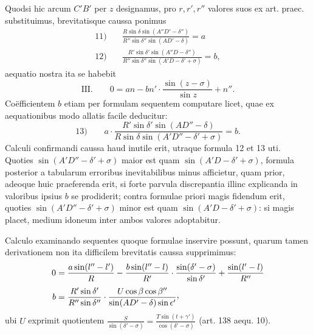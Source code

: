 Quodsi hic arcum $C'B'$ per $z$ designamus, pro $r,r',r''$ valores suos ex art.
praec. substituimus, brevitatisque caussa ponimus
\[
\begin{aligned}
11)\quad&\frac{R\sin\delta\sin(A''D'-\delta'')}{R''\sin\delta''\sin(AD'-\delta)}=a\\[.8ex]
12)\quad&\frac{R'\sin\delta'\sin(A''D-\delta'')}{R''\sin\delta''\sin(A'D-\delta'+\sigma)}=b,
\end{aligned}
\]
aequatio nostra ita se habebit
\[
\text{III.}\qquad 0=an-bn'\cdot\frac{\sin(z-\sigma)}{\sin z}+n''.
\]
Coëfficientem $b$ etiam per formulam sequentem computare licet, quae ex aequationibus modo allatis facile deducitur:
\[
13)\qquad a\cdot\frac{R'\sin\delta'\sin(AD''-\delta)}{R\sin\delta\sin(A'D''-\delta'+\sigma)}=b.
\]
Calculi confirmandi caussa haud inutile erit, utraque formula 12 et 13 uti.
\hypertarget{native-189}{}Quoties $\sin(A'D''-\delta'+\sigma)$ maior est quam $\sin(A'D-\delta'+\sigma)$, formula posterior
a tabularum erroribus inevitabilibus minus afficietur, quam prior, adeoque huic
praeferenda erit, si forte parvula discrepantia illinc explicanda in valoribus
ipsius $b$ se prodiderit; contra formulae priori magis fidendum erit, quoties
$\sin(A'D''-\delta'+\sigma)$ minor est quam $\sin(A'D-\delta'+\sigma)$: si magis placet, medium
idoneum inter ambos valores adoptabitur.

Calculo examinando sequentes quoque formulae inservire possunt, quarum
tamen derivationem non ita difficilem brevitatis caussa supprimimus:
\[
\begin{aligned}
0&=\frac{a\sin(l''-l')}{R}-\frac{b\sin(l''-l)}{R'}\cdot\frac{\sin(\delta'-\sigma)}{\sin\delta'}+\frac{\sin(l'-l)}{R''}\\[.8ex]
b&=\frac{R'\sin\delta'}{R''\sin\delta''}\cdot\frac{U\cos\beta\cos\beta''}{\sin(AD'-\delta)\sin\epsilon'}\mathpunct{\raisebox{.45ex}{,}}
\end{aligned}
\]
ubi $U$ exprimit quotientem $\frac{S}{\sin(\delta'-\sigma)}=\frac{T\sin(t+\gamma')}{\cos(\delta'-\sigma)}$ (art. 138 aequ. 10).
